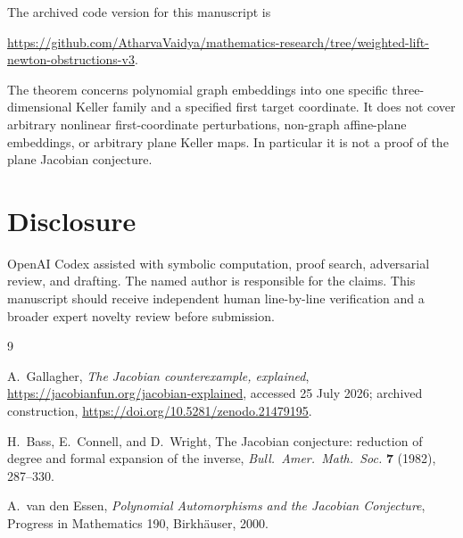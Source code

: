 \documentclass[11pt]{article}
\theoremstyle{remark}
\begin{document}
The archived code version for this manuscript is
\begin{center}
\url{https://github.com/AtharvaVaidya/mathematics-research/tree/weighted-lift-newton-obstructions-v3}.
\end{center}

The theorem concerns polynomial graph embeddings into one specific
three-dimensional Keller family and a specified first target
coordinate.  It does not cover arbitrary nonlinear first-coordinate
perturbations, non-graph affine-plane embeddings, or arbitrary plane
Keller maps.  In particular it is not a proof of the plane Jacobian
conjecture.

\section*{Disclosure}

OpenAI Codex assisted with symbolic computation, proof search,
adversarial review, and drafting.  The named author is responsible for
the claims.  This manuscript should receive independent human
line-by-line verification and a broader expert novelty review before
submission.

\begin{thebibliography}{9}

A.~Gallagher,
\emph{The Jacobian counterexample, explained},
\url{https://jacobianfun.org/jacobian-explained},
accessed 25 July 2026;
archived construction, \url{https://doi.org/10.5281/zenodo.21479195}.

H.~Bass, E.~Connell, and D.~Wright,
The Jacobian conjecture: reduction of degree and formal expansion of
the inverse,
\emph{Bull.\ Amer.\ Math.\ Soc.} \textbf{7} (1982), 287--330.

A.~van den Essen,
\emph{Polynomial Automorphisms and the Jacobian Conjecture},
Progress in Mathematics 190, Birkh\"auser, 2000.

\end{thebibliography}
\end{document}

